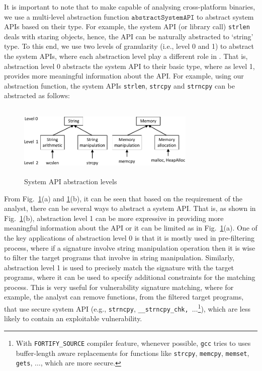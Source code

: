 It is important to note that to make \tool capable of analysing cross-platform binaries, we use a multi-level abstraction function $\mathtt{abstractSystemAPI}$ to abstract system APIs based on their type. For example, the system API (or library call) \texttt{strlen} deals with staring objects, hence, the API can be naturally abstracted to `string' type. To this end, we use two levels of granularity (i.e., level 0 and 1) to abstract the system APIs, where each abstraction level play a different role in \tool. That is, abstraction level 0 abstracts the system API to their basic type, where as level 1, provides more meaningful information about the API. For example, using our abstraction function, the system APIs \texttt{strlen}, \texttt{strcpy} and \texttt{strncpy} can be abstracted as follows:

\begin{figure}[t]
\begin{center}\vspace{-1mm}
\includegraphics[height=3.5cm, width=8.5cm]{srj-figures/srj-abs-1.pdf} \vspace{-1mm}
\caption{System API abstraction levels}
\label{fig:abs} \vspace{-1mm}
\end{center}
\end{figure}

From Fig.~\ref{fig:abs}(a) and \ref{fig:abs}(b), it can be seen that based on the requirement of the analyst, there can be several ways to abstract a system API. That is, as shown in Fig.~\ref{fig:abs}(b), abstraction level 1 can be more expressive in providing more meaningful information about the API or it can be limited as in Fig.~\ref{fig:abs}(a). One of the key applications of abstraction level 0 is that it is mostly used in pre-filtering process, where if a signature involve string manipulation operation then it is wise to filter the target programs that involve in string manipulation. Similarly, abstraction level 1 is used to precisely match the signature with the target programs, where it can be used to specify additional constraints for the matching process. This is very useful for vulnerability signature matching, where for example, the analyst can remove functions, from the filtered target programs, that use secure system API (e.g., \texttt{strncpy}, \texttt{\_\_strncpy\_chk, $\ldots$}\footnote{With \texttt{FORTIFY\_SOURCE} compiler feature, whenever possible, \texttt{gcc} tries to uses buffer-length aware replacements for functions like \texttt{strcpy}, \texttt{memcpy}, \texttt{memset}, \texttt{gets}, $\ldots$, which are more secure.}), which are less likely to contain an exploitable vulnerability.

